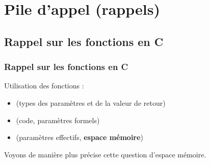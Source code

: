 \documentclass[xcolor=svgnames]{beamer}
\begin{document}
\section[Plan]{}
\frame[label=plan]{\tableofcontents}

\section{Pile d'appel (rappels)}
\subsection{Rappel sur les fonctions en C}
\begin{frame}
  \frametitle{Rappel sur les fonctions en C\nowrite}
 Utilisation des fonctions :
  \begin{itemize}
    \item {} (types des paramètres et de la valeur de retour)
    \item {}  (code, paramètres formels)
    \item {} (paramètres effectifs, \textbf{espace mémoire})
  \end{itemize}
Voyons de manière plus précise cette question d'espace mémoire.
\end{frame}
\end{document}
